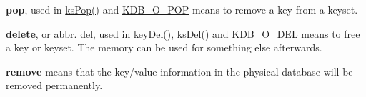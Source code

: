 \begin{DoxyItemize}
\item {\bfseries pop}, used in \hyperlink{group__keyset_gae42530b04defb772059de0600159cf69}{ks\+Pop()} and \hyperlink{group__keyset_gga98a3d6a4016c9dad9cbd1a99a9c2a45aa52fb5f2cc86773d393da62bebebf7984}{K\+D\+B\+\_\+\+O\+\_\+\+P\+O\+P} means to remove a key from a keyset.
\item {\bfseries delete}, or abbr. del, used in \hyperlink{group__key_ga3df95bbc2494e3e6703ece5639be5bb1}{key\+Del()}, \hyperlink{group__keyset_ga27e5c16473b02a422238c8d970db7ac8}{ks\+Del()} and \hyperlink{group__keyset_gga98a3d6a4016c9dad9cbd1a99a9c2a45aa66a5380c120f25f28f49848c4a863ead}{K\+D\+B\+\_\+\+O\+\_\+\+D\+E\+L} means to free a key or keyset. The memory can be used for something else afterwards.
\item {\bfseries remove} means that the key/value information in the physical database will be removed permanently. 
\end{DoxyItemize}